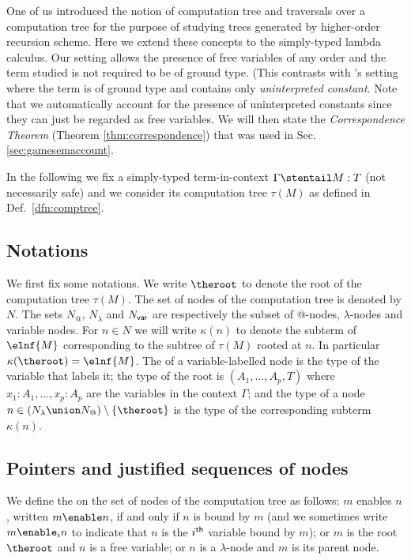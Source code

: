 One of us \cite{OngLics2006} introduced the notion of
computation tree and traversals over a computation tree for the
purpose of studying trees generated by higher-order recursion
scheme. Here we extend these concepts to the simply-typed lambda
calculus. Our setting allows the presence of free variables of any
order and the term studied is not required to be of ground type.
(This contrasts with \cite{OngLics2006}'s setting where the term is
of ground type and contains only \emph{uninterpreted
constant}.
Note that we automatically account for the
presence of uninterpreted constants since they can just be regarded
as free variables. We will then state the \emph{Correspondence
Theorem} (Theorem \ref{thm:correspondence}) that was used in Sec.
\ref{sec:gamesemaccount}.

In the following we fix a simply-typed term-in-context $\Gamma \stentail M :T$
(not necessarily safe) and we consider its computation tree
$\tau(M)$ as defined in Def.\ \ref{dfn:comptree}.

\subsection{Notations}
We first fix some notations. We write $\theroot$ to denote the root
of the computation tree $\tau(M)$. The set of nodes of the
computation tree is denoted by $N$. The sets $N_@$, $N_\lambda$ and
$N_{\sf var}$ are respectively the subset of @-nodes,
$\lambda$-nodes and variable nodes. For $n \in N$ we will write
$\kappa(n)$ to denote the subterm of $\elnf{M}$ corresponding to the
subtree of $\tau(M)$ rooted at $n$. In particular $\kappa(\theroot)
= \elnf{M}$. The  of a variable-labelled node is the
type of the variable that labels it; the type of the root is
$(A_1,\ldots,A_p, T)$ where $x_1:A_1,\ldots, x_p:A_p$ are the
variables in the context $\Gamma$; and the type of a node $n\in
(N_\lambda \union N_@) \setminus \{ \theroot \}$ is the type of the
corresponding subterm $\kappa(n)$.


\subsection{Pointers and justified sequences of nodes}

We define the  on the set of nodes of the
computation tree as follows: $m$ enables $n$, written $m \enable n$,
if and only if $n$ is bound by $m$ (and we sometimes write $m
\enable_i n$ to indicate that $n$ is the $i^{\sf th}$ variable bound
by $m$); or $m$ is the root $\theroot$ and $n$ is a free variable;
or $n$ is a $\lambda$-node and $m$ is its parent node.


